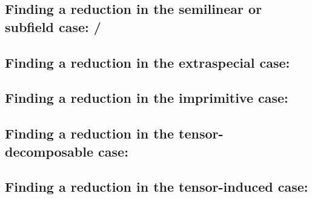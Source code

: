 \subsection{Finding a reduction in the semilinear or subfield case:
/}
\label{solveC3C5}

\subsection{Finding a reduction in the extraspecial case: }
\label{solveC6}

\subsection{Finding a reduction in the imprimitive case: }
\label{solveC2}

\subsection{Finding a reduction in the tensor-decomposable case: }
\label{solveC4}

\subsection{Finding a reduction in the tensor-induced case: }
\label{solveC7}



